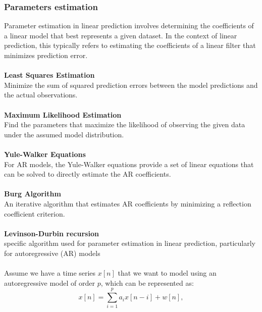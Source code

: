 \documentclass[12pt]{article}
\begin{document}
\subsubsection{Parameters estimation}\label{parameterslp}
Parameter estimation in linear prediction involves determining the coefficients of a linear
model that best represents a given dataset. In the context of linear prediction, this typically
refers to estimating the coefficients of a linear filter that minimizes prediction error.\\
\\
\textbf{Least Squares Estimation}\\
Minimize the sum of squared prediction errors between the model predictions and the actual
observations.\\
\\
\textbf{Maximum Likelihood Estimation}\\
Find the parameters that maximize the likelihood of observing the given data under the assumed
model distribution.\\
\\
\textbf{Yule-Walker Equations}\\
For AR models, the Yule-Walker equations provide a set of linear equations that can be solved
to directly estimate the AR coefficients.\\
\\
\textbf{Burg Algorithm}\\
An iterative algorithm that estimates AR coefficients by minimizing a reflection coefficient
criterion.\\
\\
\textbf{Levinson-Durbin recursion}\\
specific algorithm used for parameter estimation in linear prediction, particularly for
autoregressive (AR) models\\
\\
Assume we have a time series \( x[n] \) that we want to model using an autoregressive model of order \( p \), which can be represented as:
\begin{equation}
     x[n] = \sum_{i=1}^{p} a_i x[n-i] + w[n],
\end{equation}
\end{document}
